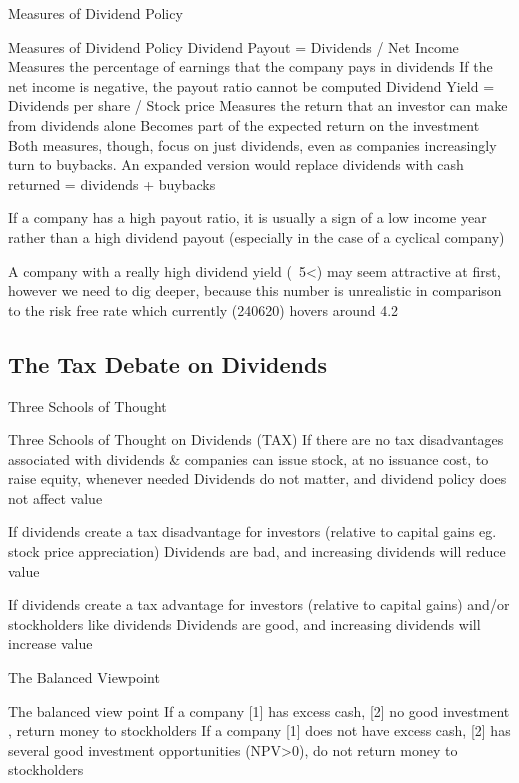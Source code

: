\documentclass[10pt]{article}
\begin{document}
    \begin{core}{Measures of Dividend Policy}

      Measures of Dividend Policy
      Dividend Payout = Dividends / Net Income
      Measures the percentage of earnings that the company pays in dividends
      If the net income is negative, the payout ratio cannot be computed
      Dividend Yield = Dividends per share / Stock price
      Measures the return that an investor can make from dividends alone
      Becomes part of the expected return on the investment
      Both measures, though, focus on just dividends, even as companies increasingly turn to buybacks. An expanded version would replace dividends with cash returned = dividends + buybacks

      If a company has a high payout ratio, it is usually a sign of a low income year rather than a high dividend payout (especially in the case of a cyclical company) 

      A company with a really high dividend yield (~5<) may seem attractive at first, however we need to dig deeper, because this number is unrealistic in comparison to the risk free rate which currently (240620) hovers around 4.2

    \end{core}

  \subsection{The Tax Debate on Dividends}

    \begin{core}{Three Schools of Thought}

      Three Schools of Thought on Dividends (TAX)
      If there are no tax disadvantages associated with dividends & companies can issue stock, at no issuance cost, to raise equity, whenever needed
      Dividends do not matter, and dividend policy does not affect value

      If dividends create a tax disadvantage for investors (relative to capital gains eg. stock price appreciation)
      Dividends are bad, and increasing dividends will reduce value

      If dividends create a tax advantage for investors (relative to capital gains) and/or stockholders like dividends
      Dividends are good, and increasing dividends will increase value

    \end{core}

    \begin{core}{The Balanced Viewpoint}

      The balanced view point
      If a company [1] has excess cash, [2] no good investment , return money to stockholders
      If a company [1] does not have excess cash, [2] has several good investment opportunities (NPV>0), do not return money to stockholders

    \end{core}
\end{document}

